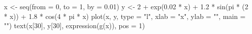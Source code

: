 \begin{Schunk}
\begin{Sinput}
 x <- seq(from = 0, to = 1, by = 0.01)
 y <- 2 + exp(0.02 * x) + 1.2 * sin(pi * (2 * x)) + 1.8 * cos(4 * pi * x)
 plot(x, y, type = "l", xlab = "x", ylab = "", main = "")
 text(x[30], y[30], expression(g(x)), pos = 1)
\end{Sinput}
\end{Schunk}
